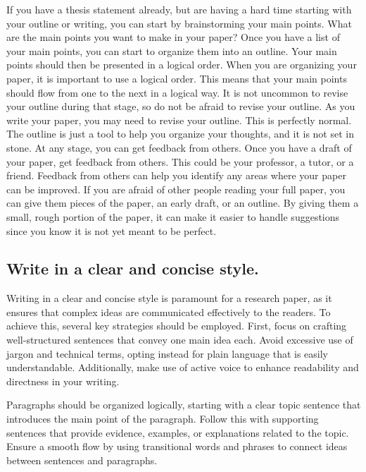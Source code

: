 \documentclass[
]{book}
\begin{document}
If you have a thesis statement already, but are having a hard time starting with your outline or writing, you can start by brainstorming your main points. What are the main points you want to make in your paper? Once you have a list of your main points, you can start to organize them into an outline. Your main points should then be presented in a logical order. When you are organizing your paper, it is important to use a logical order. This means that your main points should flow from one to the next in a logical way. It is not uncommon to revise your outline during that stage, so do not be afraid to revise your outline. As you write your paper, you may need to revise your outline. This is perfectly normal. The outline is just a tool to help you organize your thoughts, and it is not set in stone. At any stage, you can get feedback from others. Once you have a draft of your paper, get feedback from others. This could be your professor, a tutor, or a friend. Feedback from others can help you identify any areas where your paper can be improved. If you are afraid of other people reading your full paper, you can give them pieces of the paper, an early draft, or an outline. By giving them a small, rough portion of the paper, it can make it easier to handle suggestions since you know it is not yet meant to be perfect.

\hypertarget{write-in-a-clear-and-concise-style.}{%
\subsection*{Write in a clear and concise style.}\label{write-in-a-clear-and-concise-style.}}

Writing in a clear and concise style is paramount for a research paper, as it ensures that complex ideas are communicated effectively to the readers. To achieve this, several key strategies should be employed. First, focus on crafting well-structured sentences that convey one main idea each. Avoid excessive use of jargon and technical terms, opting instead for plain language that is easily understandable. Additionally, make use of active voice to enhance readability and directness in your writing.

Paragraphs should be organized logically, starting with a clear topic sentence that introduces the main point of the paragraph. Follow this with supporting sentences that provide evidence, examples, or explanations related to the topic. Ensure a smooth flow by using transitional words and phrases to connect ideas between sentences and paragraphs.
\end{document}
